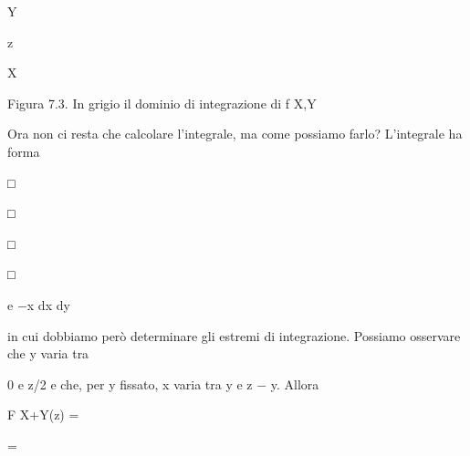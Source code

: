 \documentclass[a4paper,portrait,12pt]{article}
\begin{document}
\begin{flushleft}
Y
\end{flushleft}





\begin{flushleft}
z
\end{flushleft}





\begin{flushleft}
X
\end{flushleft}


\begin{flushleft}
Figura 7.3. In grigio il dominio di integrazione di f X,Y
\end{flushleft}





\begin{flushleft}
Ora non ci resta che calcolare l'integrale, ma come possiamo farlo? L'integrale ha forma
\end{flushleft}


□





□





□





□





\begin{flushleft}
e $-$x dx dy
\end{flushleft}





\begin{flushleft}
in cui dobbiamo per\`{o} determinare gli estremi di integrazione. Possiamo osservare che y varia tra
\end{flushleft}


\begin{flushleft}
0 e z/2 e che, per y fissato, x varia tra y e z $-$ y. Allora
\end{flushleft}


\begin{flushleft}
F X+Y(z) =
\end{flushleft}


=
\end{document}
